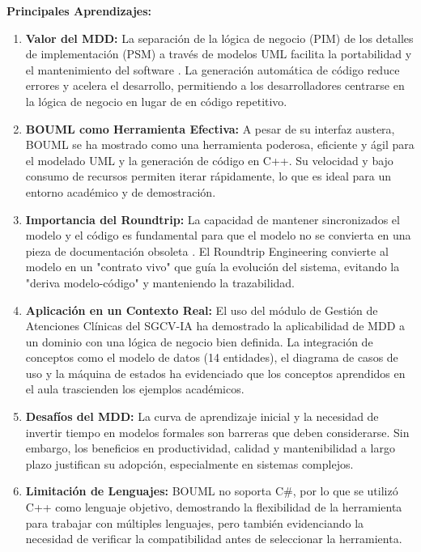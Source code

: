 \documentclass[12pt,a4paper]{article}
\begin{document}
\textbf{Principales Aprendizajes:}

\begin{enumerate}
    \item \textbf{Valor del MDD:} La separación de la lógica de negocio (PIM) de los detalles de implementación (PSM) a través de modelos UML facilita la portabilidad y el mantenimiento del software \cite{schmidt2006, selic2003}. La generación automática de código reduce errores y acelera el desarrollo, permitiendo a los desarrolladores centrarse en la lógica de negocio en lugar de en código repetitivo.
    
    \item \textbf{BOUML como Herramienta Efectiva:} A pesar de su interfaz austera, BOUML se ha mostrado como una herramienta poderosa, eficiente y ágil para el modelado UML y la generación de código en C++. Su velocidad y bajo consumo de recursos permiten iterar rápidamente, lo que es ideal para un entorno académico y de demostración.
    
    \item \textbf{Importancia del Roundtrip:} La capacidad de mantener sincronizados el modelo y el código es fundamental para que el modelo no se convierta en una pieza de documentación obsoleta \cite{pohl2025}. El Roundtrip Engineering convierte al modelo en un "contrato vivo" que guía la evolución del sistema, evitando la "deriva modelo-código" y manteniendo la trazabilidad.
    
    \item \textbf{Aplicación en un Contexto Real:} El uso del módulo de Gestión de Atenciones Clínicas del SGCV-IA ha demostrado la aplicabilidad de MDD a un dominio con una lógica de negocio bien definida. La integración de conceptos como el modelo de datos (14 entidades), el diagrama de casos de uso y la máquina de estados ha evidenciado que los conceptos aprendidos en el aula trascienden los ejemplos académicos.
    
    \item \textbf{Desafíos del MDD:} La curva de aprendizaje inicial y la necesidad de invertir tiempo en modelos formales son barreras que deben considerarse. Sin embargo, los beneficios en productividad, calidad y mantenibilidad a largo plazo justifican su adopción, especialmente en sistemas complejos.
    
    \item \textbf{Limitación de Lenguajes:} BOUML no soporta C\#, por lo que se utilizó C++ como lenguaje objetivo, demostrando la flexibilidad de la herramienta para trabajar con múltiples lenguajes, pero también evidenciando la necesidad de verificar la compatibilidad antes de seleccionar la herramienta.
\end{enumerate}
\end{document}
